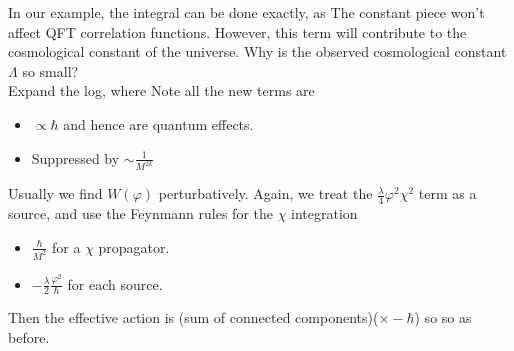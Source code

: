 \documentclass{article}
\begin{document}
In our example, the integral can be done exactly, as 
The constant piece won't affect QFT correlation functions. However, this term will contribute to the cosmological constant of the universe. Why is the observed cosmological constant $\Lambda$ so small? \\ 
Expand the log, 
where 
Note all the new terms are
\begin{itemize}
    \item  $\propto \hbar$ and hence are quantum effects.
    \item  Suppressed by $\sim \frac{1}{M^{2k}}$
\end{itemize}
Usually we find $W(\varphi)$ perturbatively. Again, we treat the $\frac{\lambda}{4} \varphi^2\chi^2$ term as a source, and use the Feynmann rules for the $\chi$ integration 
\begin{itemize}
    \item $\frac{\hbar}{M^2}$ for a $\chi$ propagator. 
    \item $-\frac{\lambda}{2}\frac{\varphi^2}{\hbar}$ for each source. 
\end{itemize}
Then the effective action is (sum of connected components)($\times -\hbar$) so 
so 
as before. 
\end{document}

